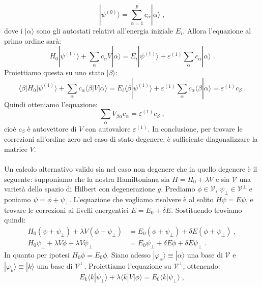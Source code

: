 \documentclass[12pt,a4paper]{report}
\theoremstyle{definition}
\numberwithin{equation}{section}
\newcommand{\bra}{\langle}
\newcommand{\ket}{\rangle}
\begin{document}
\begin{equation}
|\psi^{(0)}\ket=\sum_{\alpha=1}^p c_{\alpha}|\alpha\ket\;,
\end{equation}
dove i $|\alpha\ket$ sono gli autostati relativi all'energia iniziale $E_i$. Allora l'equazione al primo ordine sarà:
\begin{equation}
H_0|\psi^{(1)}\ket+\sum_{\alpha} c_{\alpha} V|\alpha\ket=E_i|\psi^{(1)}\ket+\varepsilon^{(1)}\sum_{\alpha} c_{\alpha}|\alpha\ket\;.
\end{equation}
Proiettiamo questa su uno stato $|\beta\ket$:
\begin{equation}
\bra \beta|H_0|\psi^{(1)}\ket+\sum_{\alpha} c_{\alpha}\bra\beta|V|\alpha\ket=E_i\bra\beta|\psi^{(1)}\ket+\varepsilon^{(1)}\sum_{\alpha}c_{\alpha}\bra\beta|\alpha\ket=\varepsilon^{(1)}c_{\beta}\;.
\end{equation}
Quindi otteniamo l'equazione:
\begin{equation}
\sum_{\alpha} V_{\beta\alpha}c_{\alpha}=\varepsilon^{(1)}c_{\beta}\;,
\end{equation}
cioè $c_{\beta}$ è autovettore di $V$ con autovalore $\varepsilon^{(1)}$. In conclusione, per trovare le correzioni all'ordine zero nel caso di stato degenere, è sufficiente diagonalizzare la matrice $V$. \\
\\
Un calcolo alternativo valido sia nel caso non degenere che in quello degenere è il seguente: supponiamo che la nostra Hamiltoniana sia $H=H_0+\lambda V$ e sia $\mathcal{V}$ una varietà dello spazio di Hilbert con degenerazione $g$. Prediamo $\phi\in \mathcal{V}$, $\psi_{\perp}\in\mathcal{V}^{\perp}$ e poniamo $\psi=\phi+\psi_{\perp}$. L'equazione che vogliamo risolvere è al solito $H\psi=E\psi$, e trovare le correzioni ai livelli energentici $E=E_0+\delta E$. Sostituendo troviamo quindi:
\begin{align*}
H_0(\psi+\psi_{\perp})+\lambda V(\phi+\psi_{\perp}) &=E_0(\phi+\psi_{\perp})+\delta E(\phi+\psi_{\perp})\;, \\
H_0\psi_{\perp}+\lambda V\phi+\lambda V\psi_{\perp} &= E_0\psi_{\perp}+\delta E\phi+\delta E\psi_{\perp}\;.
\end{align*}
In quanto per ipotesi $H_0\phi=E_0\phi$. Siano adesso $|\varphi_{\alpha}\ket\equiv |\alpha\ket$ una base di $\mathcal{V}$ e $|\varphi_k\ket\equiv|k\ket$ una base di $\mathcal{V}^{\perp}$. Proiettiamo l'equazione su $\mathcal{V}^{\perp}$, ottenendo:
\begin{equation}
E_k\bra k|\psi_{\perp}\ket+\lambda\bra k|V|\phi\ket=E_0\bra k|\psi_{\perp}\ket\;,
\end{equation}
\end{document}

